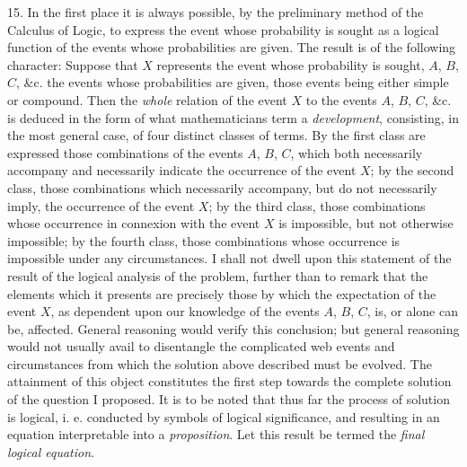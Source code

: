 \documentclass[oneside]{book}
\begin{document}
15. In the first place it is always possible, by the preliminary
method of the Calculus of Logic, to express the event whose
probability is sought as a logical function of the events whose
probabilities are given. The result is of the following character:
Suppose that $X$ represents the event whose probability is sought,
$A$, $B$, $C$, \&c. the events whose probabilities are given, those
events being either simple or compound. Then the \textit{whole} relation
of the event $X$ to the events $A$, $B$, $C$, \&c. is deduced in the
form of what mathematicians term a \textit{development}, consisting, in
the most general case, of four distinct classes of terms. By the
first class are expressed those combinations of the events $A$, $B$, $C$,
which both necessarily accompany and necessarily indicate the
occurrence of the event $X$; by the second class, those combinations
which necessarily accompany, but do not necessarily imply,
the occurrence of the event $X$; by the third class, those combinations
whose occurrence in connexion with the event $X$ is impossible,
but not otherwise impossible; by the fourth class,
those combinations whose occurrence is impossible under any circumstances.
I shall not dwell upon this statement of the result
of the logical analysis of the problem, further than to remark
that the elements which it presents are precisely those by which
the expectation of the event $X$, as dependent upon our knowledge
of the events $A$, $B$, $C$, is, or alone can be, affected. General
reasoning would verify this conclusion; but general reasoning
would not usually avail to disentangle the complicated web
events and circumstances from which the solution above described
must be evolved. The attainment of this object constitutes
the first step towards the complete solution of the question I
proposed. It is to be noted that thus far the process of solution
is logical, i. e. conducted by symbols of logical significance, and
resulting in an equation interpretable into a \textit{proposition}. Let this
result be termed the \textit{final logical equation}.
\end{document}
